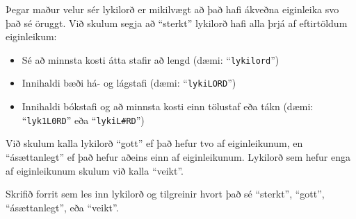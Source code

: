 \begin{problem}
	Þegar maður velur sér lykilorð er mikilvægt að það hafi ákveðna eiginleika svo það sé öruggt. Við skulum segja að "`sterkt"' lykilorð hafi alla þrjá af eftirtöldum eiginleikum:

	\begin{itemize}
		\item Sé að minnsta kosti átta stafir að lengd (dæmi: "`\texttt{lykilord}"')
		\item Innihaldi bæði há- og lágstafi (dæmi: "`\texttt{lykiLORD}"')
		\item Innihaldi bókstafi og að minnsta kosti einn tölustaf eða tákn (dæmi: "`\texttt{lyk1L0RD}"' eða "`\texttt{lykiL\#{}RD}"')
	\end{itemize}

	Við skulum kalla lykilorð "`gott"' ef það hefur tvo af eiginleikunum, en "`ásættanlegt"' ef það hefur aðeins einn af eiginleikunum. Lykilorð sem hefur enga af eiginleikunum skulum við kalla "`veikt"'.

	Skrifið forrit sem les inn lykilorð og tilgreinir hvort það sé "`sterkt"', "`gott"', "`ásættanlegt"', eða "`veikt"'.

\begin{example}
%
\end{example}
\begin{example}
%
\end{example}
\begin{example}
%
\end{example}
\begin{example}
%
\end{example}
\end{problem}